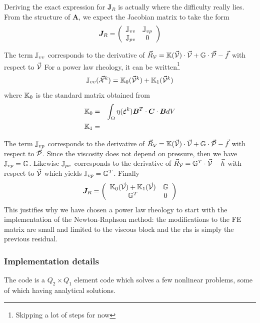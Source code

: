 \begin{itemize}
Deriving the exact expression for ${\bm J}_R$ is actually where the difficulty really lies.
From the structure of ${\bm A}$, we expect the Jacobian matrix to take the form
\[
{\bm J}_R = 
\left(
\begin{array}{cc}
{\mathbb{J}}_{vv} & {\mathbb{J}}_{vp}  \\
{\mathbb{J}}_{pv} & 0 
\end{array}
\right)
\] 

The term ${\mathbb{J}}_{vv}$ corresponds to the derivative of
$\vec{R}_{\cal V}= {\mathbb{K}}(\vec{\cal V}) \cdot \vec{\cal V} + {\mathbb{G}} \cdot \vec{\cal P} - \vec{f}$
with respect to $\vec{\cal V}$
For a power law rheology, it can be written\footnote{Skipping a lot of steps for now}
\[
{\mathbb{J}}_{vv}(\vec{\cal X}^k) = {\mathbb{K}}_0(\vec{\cal V}^k)+{\mathbb{K}}_1(\vec{\cal V}^k)
\]
where ${\mathbb{K}}_0$ is the standard matrix obtained from 
\begin{eqnarray}
{\mathbb{K}}_0 &=& \int_\Omega \eta(\dot{\bm \varepsilon}^k) {\bm B}^T \cdot {\bm C} \cdot  {\bm B} dV \\
{\mathbb{K}}_1 &=& 
\end{eqnarray}


The term ${\mathbb{J}}_{vp}$ corresponds to the derivative of 
$\vec{R}_{\cal V}= {\mathbb{K}}(\vec{\cal V}) \cdot \vec{\cal V} + {\mathbb{G}} \cdot \vec{\cal P} - \vec{f}$ 
with respect to $\vec{\cal P}$. Since the viscosity does not depend on pressure, 
then we have ${\mathbb{J}}_{vp}={\mathbb{G}}$.
Likewise ${\mathbb{J}}_{pv}$ corresponds to the derivative of
$\vec{R}_{\cal V}= {\mathbb{G}}^T \cdot \vec{\cal V} -\vec{h}$  with respect to $\vec{\cal V}$
which yields ${\mathbb{J}}_{vp}={\mathbb{G}}^T$.
Finally 
\[
{\bm J}_R = 
\left(
\begin{array}{cc}
{\mathbb{K}}_0(\vec{\cal V}) + {\mathbb{K}}_1(\vec{\cal V}) & {\mathbb{G}}  \\
{\mathbb{G}}^T & 0 
\end{array}
\right)
\] 
This justifies why we have chosen a power law rheology to start with the implementation of 
the Newton-Raphson method: the modifications to the FE matrix are small and limited 
to the viscous block and the rhs is simply the previous residual. 
 
\end{itemize}


\subsubsection*{Implementation details}

The code is a $Q_2 \times Q_1$ element code which solves 
a few nonlinear problems, some of which having analytical solutions. 

